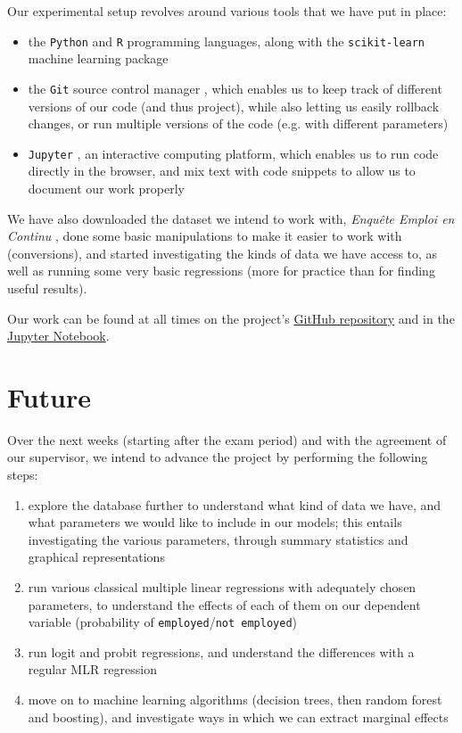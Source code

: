 \documentclass[a4paper]{article}
\begin{document}
Our experimental setup revolves around various tools that we have put in place:
\begin{itemize}
    \item the \texttt{Python} and \texttt{R} programming languages, along with the \texttt{scikit-learn} machine learning package \cite{python}\cite{R}\cite{learn}
    \item the \texttt{Git} source control manager \cite{git}, which enables us to keep track of different versions of our code (and thus project), while also letting us easily rollback changes, or run multiple versions of the code (e.g. with different parameters)
    \item \texttt{Jupyter} \cite{jupyter}, an interactive computing platform, which enables us to run code directly in the browser, and mix text with code snippets to allow us to document our work properly
\end{itemize}

We have also downloaded the dataset we intend to work with, \emph{Enqu\^ete Emploi en Continu} \cite{enquete}, done some basic manipulations to make it easier to work with (conversions), and started investigating the kinds of data we have access to, as well as running some very basic regressions (more for practice than for finding useful results).

Our work can be found at all times on the project's \href{https://github.com/ncocacola/econml/}{GitHub repository} and in the \href{https://github.com/ncocacola/econml/blob/master/econml.ipynb}{Jupyter Notebook}.

\section{Future}
Over the next weeks (starting after the exam period) and with the agreement of our supervisor, we intend to advance the project by performing the following steps:
\begin{enumerate}
    \item explore the database further to understand what kind of data we have, and what parameters we would like to include in our models; this entails investigating the various parameters, through summary statistics and graphical representations
    \item run various classical multiple linear regressions with adequately chosen parameters, to understand the effects of each of them on our dependent variable (probability of \texttt{employed}/\texttt{not employed})
    \item run logit and probit regressions, and understand the differences with a regular MLR regression
    \item move on to machine learning algorithms (decision trees, then random forest and boosting), and investigate ways in which we can extract marginal effects
\end{enumerate}
\end{document}

